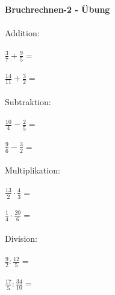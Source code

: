 


	\textbf{Bruchrechnen-2 - Übung}\\\\
	Addition:\\\\
	$\frac{3}{7}+\frac{9}{5}=$\\\\
	$\frac{14}{11}+\frac{3}{2}=$\\\\
	Subtraktion:\\\\
	$\frac{10}{4}-\frac{2}{5}=$\\\\
	$\frac{9}{6}-\frac{3}{2}=$\\\\
	Multiplikation:\\\\
	$\frac{13}{2}\cdot\frac{4}{3}=$\\\\
	$\frac{1}{4}\cdot\frac{20}{6}=$\\\\
	Division:\\\\
	$\frac{9}{2}:\frac{12}{5}=$\\\\
	$\frac{17}{5}:\frac{34}{10}=$\\\\

